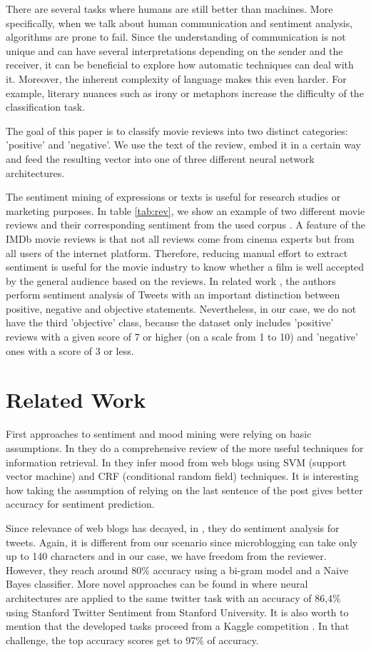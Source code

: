 \documentclass[conference]{IEEEtran}
\theoremstyle{plain}
\theoremstyle{definition}
\theoremstyle{remark}
\begin{document}
There are several tasks where humans are still better than machines. More specifically, when we talk about human communication and sentiment analysis, algorithms are prone to fail. Since the understanding of communication is not unique and can have several interpretations depending on the sender and the receiver, it can be beneficial to explore how automatic techniques can deal with it. Moreover, the inherent complexity of language makes this even harder. For example, literary nuances such as irony or metaphors increase the difficulty of the classification task.

The goal of this paper is to classify movie reviews into two distinct categories: 'positive' and 'negative'. We use the text of the review, embed it in a certain way and feed the resulting vector into one of three different neural network architectures.

The sentiment mining of expressions or texts is useful for research studies or marketing purposes. In table \ref{tab:rev}, we show an example of two different movie reviews and their corresponding sentiment from the used corpus \cite{imdb_data}. A feature of the IMDb movie reviews is that not all reviews come from cinema experts but from all users of the internet platform. Therefore, reducing manual effort to extract sentiment is useful for the movie industry to know whether a film is well accepted by the general audience based on the reviews. In related work \cite{Pak}, the authors perform sentiment analysis of Tweets with an important distinction between positive, negative and objective statements. Nevertheless, in our case, we do not have the third 'objective' class, because the dataset only includes 'positive' reviews with a given score of 7 or higher (on a scale from 1 to 10) and 'negative' ones with a score of 3 or less. 

\section{Related Work}
\label{sec:rel_work}
First approaches to sentiment and mood mining were relying on basic assumptions. In \cite{Pang} they do a comprehensive review of the more useful techniques for information retrieval.  In \cite{Yang} they infer mood from web blogs using SVM (support vector machine) and CRF (conditional random field) techniques. It is interesting how taking the assumption of relying on the last sentence of the post gives better accuracy for sentiment prediction. 

Since relevance of web blogs has decayed, in \cite{Pak}, they do sentiment analysis for tweets. Again, it is different from our scenario since microblogging can take only up to 140 characters and in our case, we have freedom from the reviewer. However, they reach around 80$\%$ accuracy using a bi-gram model and a Naive Bayes classifier. More novel approaches can be found in \cite{Noguishe} where neural architectures are applied to the same twitter task with an accuracy of 86,4$\%$ using Stanford Twitter Sentiment from Stanford University. It is also worth to mention that the developed tasks proceed from a Kaggle competition \cite{Kaggle}. In that challenge, the top accuracy scores get to 97$\%$ of accuracy. 
\end{document}

